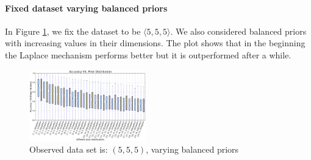\documentclass[sigconf]{acmart}
\begin{document}




\paragraph{Fixed dataset varying balanced priors}
\label{subsubsec_vs_prior}
In Figure \ref{fig_vs_prior}, we fix the dataset to be $\langle 5,5,5\rangle$.
We also considered balanced priors with increasing values in their dimensions.
The plot shows that in the beginning the Laplace mechanism performs better but
it is outperformed after a while.
\begin{figure}[H]
\centering
\includegraphics[width=0.45\textwidth]{accuracy_vs_prior_5_5_5.eps}
\caption{Observed data set is: $(5,5,5)$, varying balanced priors}
\label{fig_vs_prior}
\end{figure}







\end{document}
